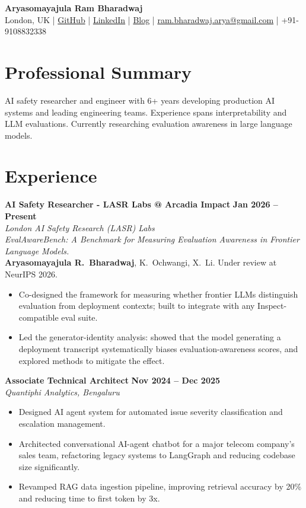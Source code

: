 \documentclass[11pt]{article}
\newcommand{\entrygap}{\vspace{8pt}}
\begin{document}
\begin{center}
\textbf{\Large Aryasomayajula Ram Bharadwaj} \\
\vspace{4pt}
London, UK | \href{https://github.com/arbdwj}{GitHub} | \href{https://www.linkedin.com/in/arbharadwaj97/}{LinkedIn} | \href{https://fullwrong.com}{Blog} | \href{mailto:ram.bharadwaj.arya@gmail.com}{ram.bharadwaj.arya@gmail.com} | +91-9108832338
\end{center}

\vspace{8pt}
\section{Professional Summary}
AI safety researcher and engineer with 6+ years developing production AI systems and leading engineering teams. Experience spans interpretability and LLM evaluations. Currently researching evaluation awareness in large language models.


\section{Experience}

\textbf{AI Safety Researcher - LASR Labs @ Arcadia Impact} \hfill \textbf{Jan 2026 -- Present} \\
\textit{London AI Safety Research (LASR) Labs} \\[2pt]
\textit{EvalAwareBench: A Benchmark for Measuring Evaluation Awareness in Frontier Language Models.} \\
\textbf{Aryasomayajula R.~Bharadwaj}, K.~Ochwangi, X.~Li. Under review at NeurIPS 2026.
\begin{itemize}[leftmargin=*, nosep]
\item Co-designed the framework for measuring whether frontier LLMs distinguish evaluation from deployment contexts; built to integrate with any Inspect-compatible eval suite.
\item Led the generator-identity analysis: showed that the model generating a deployment transcript systematically biases evaluation-awareness scores, and explored methods to mitigate the effect.
\end{itemize}

\entrygap
\textbf{Associate Technical Architect} \hfill \textbf{Nov 2024 -- Dec 2025} \\
\textit{Quantiphi Analytics, Bengaluru}
\begin{itemize}[leftmargin=*, nosep]
\item Designed AI agent system for automated issue severity classification and escalation management.
\item Architected conversational AI-agent chatbot for a major telecom company's sales team, refactoring legacy systems to LangGraph and reducing codebase size significantly.
\item Revamped RAG data ingestion pipeline, improving retrieval accuracy by 20\% and reducing time to first token by 3x.
\end{itemize}
\end{document}
